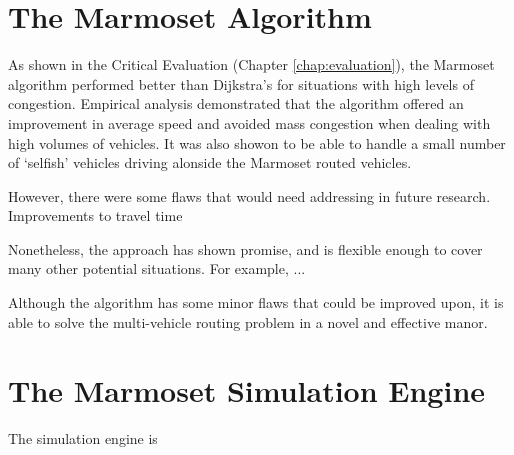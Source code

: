 \documentclass[ %
                    author={Alexander Hill},
                supervisor={Dr. Benjamin Sach},
                    degree={MEng},
                     title={MARMOSET},
                  subtitle={Multi-Agent Route Management using Online Simulation for Efficient Transportation},
                      type={research},
                      year={2016} ]{dissertation}
\begin{document}
\section{The Marmoset Algorithm}

As shown in the Critical Evaluation (Chapter \ref{chap:evaluation}), the
Marmoset algorithm performed better than Dijkstra's for situations with high
levels of congestion. Empirical analysis demonstrated that the algorithm offered
an improvement in average speed and avoided mass congestion when dealing with
high volumes of vehicles. It was also showon to be able to handle a small number
of `selfish' vehicles driving alonside the Marmoset routed vehicles.

However, there were some flaws that would need addressing in future research.
Improvements to travel time

Nonetheless, the approach has shown promise, and is flexible enough to cover
many other potential situations. For example, ...

Although the algorithm has some minor flaws that could be improved upon, it is
able to solve the multi-vehicle routing problem in a novel and effective manor.

\section{The Marmoset Simulation Engine}

The simulation engine is




\end{document}
